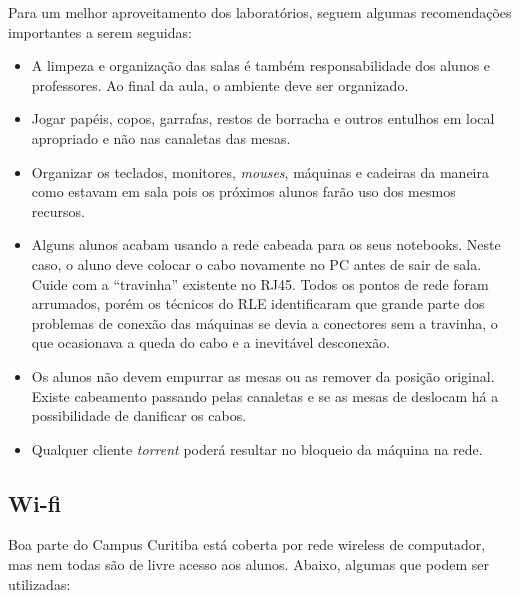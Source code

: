 \documentclass[a4paper,12pt,openany]{article}
\begin{document}
Para um melhor aproveitamento dos laboratórios, seguem algumas recomendações importantes a serem seguidas:

\begin{itemize}
\item A limpeza e organização das salas é também responsabilidade dos alunos e professores. Ao final da aula, o ambiente deve ser organizado.
\item Jogar papéis, copos, garrafas, restos de borracha e outros entulhos em local apropriado e não nas canaletas das mesas.
\item Organizar os teclados, monitores, \textit{mouses}, máquinas e cadeiras da maneira como estavam em sala pois os próximos alunos farão uso dos mesmos recursos.
\item Alguns alunos acabam usando a rede cabeada para os seus notebooks. Neste caso, o aluno deve colocar o cabo novamente no PC antes de sair de sala. Cuide com a ``travinha'' existente no RJ45. Todos os pontos de rede foram arrumados, porém os técnicos do RLE identificaram que grande  parte dos problemas de conexão das máquinas se devia a conectores sem a travinha, o que ocasionava a queda do cabo e a inevitável desconexão.
\item Os alunos não devem empurrar as mesas ou as remover da posição original. Existe cabeamento passando pelas canaletas e se as mesas de deslocam há a possibilidade de danificar os cabos.
\item Qualquer cliente \textit{torrent} poderá resultar no bloqueio da máquina na rede.
\end{itemize}

\subsection{Wi-fi}
Boa parte do Campus Curitiba está coberta por rede wireless de computador, mas nem todas são de livre acesso aos alunos. Abaixo, algumas que podem ser utilizadas:
\end{document}
